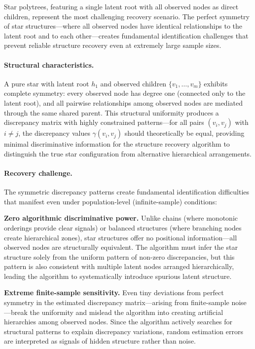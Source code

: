 \documentclass[11pt,a4paper]{article}
\numberwithin{equation}{section}
\begin{document}
Star polytrees, featuring a single latent root with all observed nodes as direct children, represent the most challenging recovery scenario. The perfect symmetry of star structures—where all observed nodes have identical relationships to the latent root and to each other—creates fundamental identification challenges that prevent reliable structure recovery even at extremely large sample sizes.

\paragraph{Structural characteristics.} A pure star with latent root $h_1$ and observed children $\{v_1, \ldots, v_m\}$ exhibits complete symmetry: every observed node has degree one (connected only to the latent root), and all pairwise relationships among observed nodes are mediated through the same shared parent. This structural uniformity produces a discrepancy matrix with highly constrained patterns—for all pairs $(v_i, v_j)$ with $i \neq j$, the discrepancy values $\gamma(v_i, v_j)$ should theoretically be equal, providing minimal discriminative information for the structure recovery algorithm to distinguish the true star configuration from alternative hierarchical arrangements.

\paragraph{Recovery challenge.} The symmetric discrepancy patterns create fundamental identification difficulties that manifest even under population-level (infinite-sample) conditions:

\textbf{Zero algorithmic discriminative power.} Unlike chains (where monotonic orderings provide clear signals) or balanced structures (where branching nodes create hierarchical zones), star structures offer no positional information—all observed nodes are structurally equivalent. The algorithm must infer the star structure solely from the uniform pattern of non-zero discrepancies, but this pattern is also consistent with multiple latent nodes arranged hierarchically, leading the algorithm to systematically introduce spurious latent structure.

\textbf{Extreme finite-sample sensitivity.} Even tiny deviations from perfect symmetry in the estimated discrepancy matrix—arising from finite-sample noise—break the uniformity and mislead the algorithm into creating artificial hierarchies among observed nodes. Since the algorithm actively searches for structural patterns to explain discrepancy variations, random estimation errors are interpreted as signals of hidden structure rather than noise.
\end{document}
